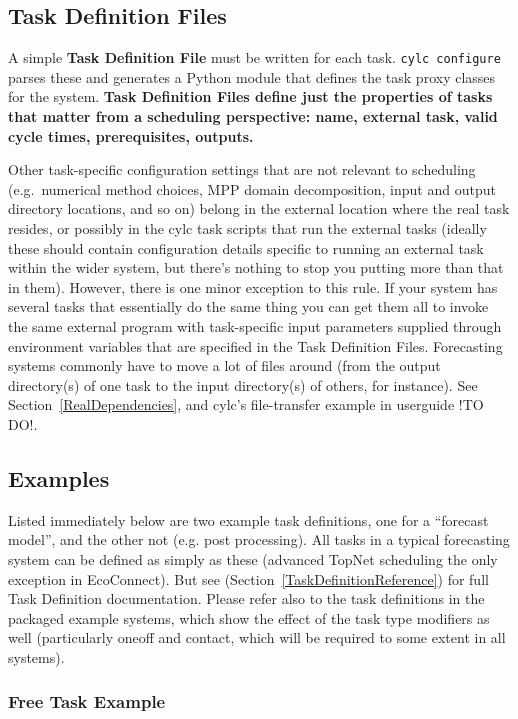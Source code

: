 \documentclass[11pt,a4paper]{article}
\begin{document}
\subsection{Task Definition Files} 
\label{TaskDefinitionFiles}

A simple {\bf Task Definition File} must be written for each task.
\lstinline=cylc configure= parses these and generates a Python module
that defines the task proxy classes for the system. {\bf Task
Definition Files define just the properties of tasks that matter from a
scheduling perspective: name, external task, valid cycle times,
prerequisites, outputs.} 

Other task-specific configuration settings that are not relevant to
scheduling (e.g.\ numerical method choices, MPP
domain decomposition, input and output directory locations, and so on)
belong in the external location where the real task resides, or possibly
in the cylc task scripts that run the external tasks (ideally these
should contain configuration details specific to running an external
task within the wider system, but there's nothing to stop you putting
more than that in them). However, there is one minor exception to this
rule. If your system has several tasks that essentially do the same
thing you can get them all to invoke the same external program with
task-specific input parameters supplied through environment variables
that are specified in the Task Definition Files. Forecasting systems
commonly have to move a lot of files around (from the output
directory(s) of one task to the input directory(s) of others, for
instance). See Section~\ref{RealDependencies}, and cylc's file-transfer
example in userguide !TO DO!. 

\subsection{Examples}

Listed immediately below are two example task definitions, one for a
``forecast model'', and the other not (e.g. post processing). All tasks
in a typical forecasting system can be defined as simply as these
(advanced TopNet scheduling the only exception in EcoConnect). 
But see (Section~\ref{TaskDefinitionReference}) for full Task Definition
documentation. Please refer also to the task definitions in the packaged
example systems, which show the effect of the task type modifiers as well
(particularly oneoff and contact, which will be required to some extent
in all systems).


\subsubsection{Free Task Example}
\end{document}

